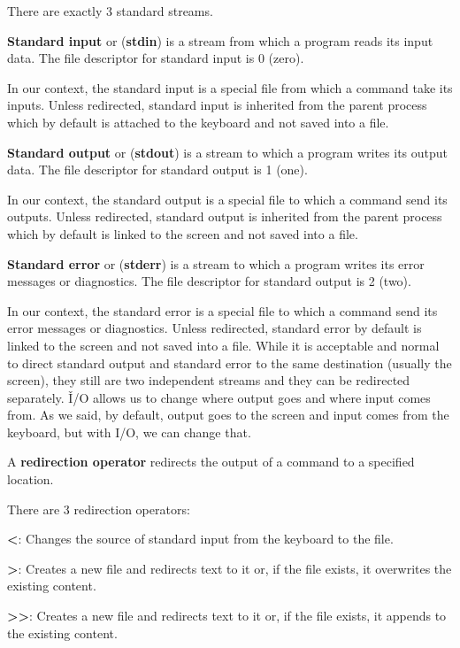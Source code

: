 There are exactly 3 standard streams.

\textbf{Standard input} or (\textbf{stdin}) is a stream from which a program reads its input data. The file descriptor
for standard input is 0 (zero).
\ed

In our context, the standard input is a special file from which a command take its inputs. Unless redirected,
standard input is inherited from the parent process which by default is attached to the keyboard and not saved into a
file.

\textbf{Standard output} or (\textbf{stdout}) is a stream to which a program writes its output data. The file descriptor
for standard output is 1 (one).
\ed

In our context, the standard output is a special file to which a command send its outputs. Unless redirected,
standard output is inherited from the parent process which by default is linked to the screen and not saved into a
file.

\textbf{Standard error} or (\textbf{stderr}) is a stream to which a program writes its error messages or diagnostics.
The file descriptor for standard output is 2 (two).
\ed

In our context, the standard error is a special file to which a command send its error messages or diagnostics.
Unless redirected, standard error by default is linked to the screen and not saved into a file. While it is acceptable
and normal to direct standard output and standard error to the same destination (usually the screen), they still are two
independent streams and they can be redirected separately. \v

I/O allows us to change where output goes and where input comes from. As we said, by default, output goes to the screen
and input comes from the keyboard, but with I/O, we can change that.

A \textbf{redirection operator} redirects the output of a command to a specified location.
\ed

There are 3 redirection operators:
\bit
\item \textbf{<}: Changes the source of standard input from the keyboard to the file.
\item \textbf{>}: Creates a new file and redirects text to it or, if the file exists, it overwrites the existing
content.
\item \textbf{>>}: Creates a new file and redirects text to it or, if the file exists, it appends to the existing
content.
\eit

